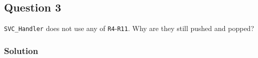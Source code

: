 \subsection*{Question 3}

\texttt{SVC\_Handler} does not use any of \texttt{R4}-\texttt{R11}.
Why are they still pushed and popped?

\subsubsection*{Solution}
